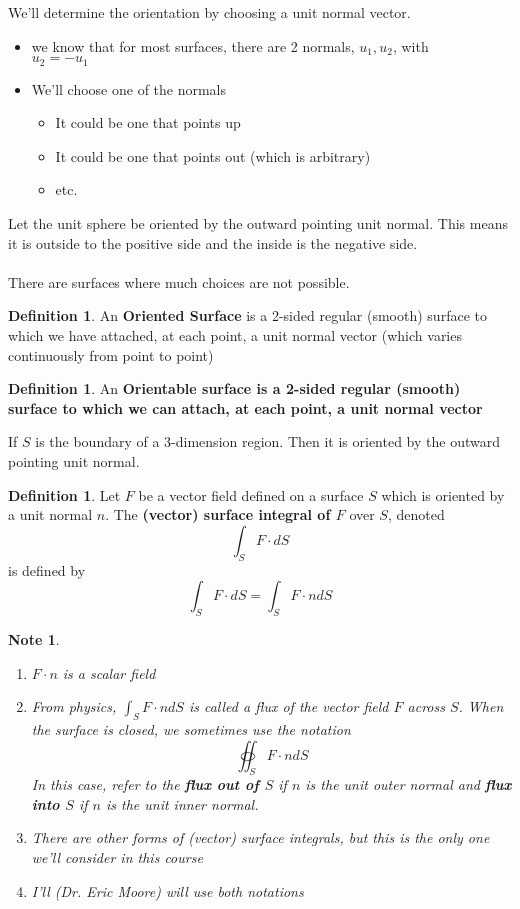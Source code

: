 \documentclass[12pt]{article}
\theoremstyle{plain}
\newtheorem*{note}{Note}
\theoremstyle{definition}
\newtheorem{definition}[theorem]{Definition}
\begin{document}
We'll determine the orientation by choosing a unit normal vector.
\begin{itemize}
	\item{we know that for most surfaces, there are 2 normals, $u_1, u_2$, with\\ $u_2 = -u_1$}
	\item{We'll choose one of the normals}
	\begin{itemize}
		\item{It could be one that points up}
		\item{It could be one that points out (which is arbitrary)}
		\item{etc.}
	\end{itemize}
\end{itemize}

Let the unit sphere be oriented by the outward pointing unit normal. This means it is outside to the positive side and the inside is the negative side.\\
\\
There are surfaces where much choices are not possible.

\begin{definition}
	An \textbf{Oriented Surface} is a 2-sided regular (smooth) surface to which we have attached, at each point, a unit normal vector (which varies continuously from point to point)
\end{definition}

\begin{definition}
	An \textbf{Orientable surface is a 2-sided regular (smooth) surface to which we can attach, at each point, a unit normal vector}
\end{definition}

If $S$ is the boundary of a 3-dimension region. Then it is oriented by the outward pointing unit normal.

\begin{definition}
	Let $F$ be a vector field defined on a surface $S$ which is oriented by a unit normal $n$. The \textbf{(vector) surface integral of $F$} over $S$, denoted
	$$\int_S F \cdot dS$$
	is defined by
	$$\int_S F \cdot dS = \int_S F \cdot n dS$$
\end{definition}

\begin{note}
	\begin{enumerate}
		\item{$F \cdot n$ is a scalar field}
		\item{From physics, $\int_S F \cdot n dS$ is called a flux of the vector field $F$ across $S$. When the surface is closed, we sometimes use the notation
		$$\oiint_S F \cdot n dS $$
		In this case, refer to the \textbf{flux out of $S$} if $n$ is the unit outer normal and \textbf{flux into $S$} if $n$ is the unit inner normal.
		}
		\item{There are other forms of (vector) surface integrals, but this is the only one we'll consider in this course}
		\item{I'll (Dr. Eric Moore) will use both notations}
	\end{enumerate}
\end{note}
\end{document}
